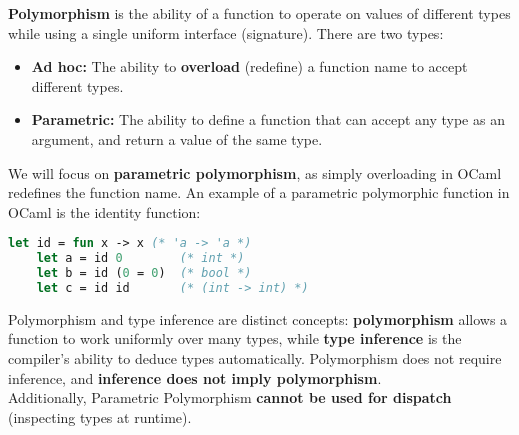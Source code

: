 \begin{Def}[Polymorphism]

    \textbf{Polymorphism} is the ability of a function to operate on values of different types while using a single uniform interface (signature).
    There are two types:
    \begin{itemize}
        \item \textbf{Ad hoc:} The ability to \textbf{overload} (redefine) a function name to accept different types.
        \item \textbf{Parametric:} The ability to define a function that can accept any type as an argument, and return a value of the same type.
    \end{itemize}
\end{Def}

\newpage
\noindent
We will focus on \textbf{parametric polymorphism}, as simply overloading in OCaml redefines the function name.
An example of a parametric polymorphic function in OCaml is the identity function:
\begin{lstlisting}[language=OCaml, numbers=none]
    let id = fun x -> x (* 'a -> 'a *)
    let a = id 0        (* int *)
    let b = id (0 = 0)  (* bool *)
    let c = id id       (* (int -> int) *)
\end{lstlisting}

\begin{Def}

    Polymorphism and type inference are distinct concepts: \textbf{polymorphism} allows a function to work uniformly over many types, while \textbf{type inference} is the compiler's ability to deduce types automatically. Polymorphism does not require inference, and \textbf{inference does not imply polymorphism}.\\

    \noindent
    Additionally, Parametric Polymorphism \textbf{cannot be used for dispatch} (inspecting types at runtime). 
    \end{Def}
    
